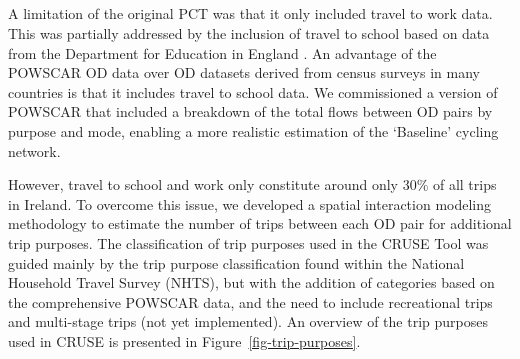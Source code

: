 \documentclass[
  super,
  preprint,
  3p]{elsarticle}
\providecommand{\DIFadd}[1]{{\protect\color{blue}\uwave{#1}}} %
\providecommand{\DIFaddbegin}{} %
\providecommand{\DIFaddend}{} %
\providecommand{\DIFdelbegin}{} %
\providecommand{\DIFdelend}{} %
\newcommand{\DIFscaledelfig}{0.5}
\newlength{\DIFdelgraphicswidth} %
\newlength{\DIFdelgraphicsheight} %
\newcommand{\DIFaddincludegraphics}[2][]{{\color{blue}\fbox{\DIFOincludegraphics[#1]{#2}}}} %
\newcommand{\DIFdelincludegraphics}[2][]{%
\sbox{\DIFdelgraphicsbox}{\DIFOincludegraphics[#1]{#2}}%
\settoboxwidth{\DIFdelgraphicswidth}{\DIFdelgraphicsbox} %
\settoboxtotalheight{\DIFdelgraphicsheight}{\DIFdelgraphicsbox} %
\scalebox{\DIFscaledelfig}{%
\parbox[b]{\DIFdelgraphicswidth}{\usebox{\DIFdelgraphicsbox}\\[-\baselineskip] \rule{\DIFdelgraphicswidth}{0em}}\llap{\resizebox{\DIFdelgraphicswidth}{\DIFdelgraphicsheight}{%
\setlength{\unitlength}{\DIFdelgraphicswidth}%
\begin{picture}(1,1)%
\thicklines\linethickness{2pt} %
{\color[rgb]{1,0,0}\put(0,0){\framebox(1,1){}}}%
{\color[rgb]{1,0,0}\put(0,0){\line( 1,1){1}}}%
{\color[rgb]{1,0,0}\put(0,1){\line(1,-1){1}}}%
\end{picture}%
}\hspace*{3pt}}} %
} %
\DeclareRobustCommand{\DIFaddbegin}{\DIFOaddbegin \let\includegraphics\DIFaddincludegraphics} %
\DeclareRobustCommand{\DIFaddend}{\DIFOaddend \let\includegraphics\DIFOincludegraphics} %
\DeclareRobustCommand{\DIFdelbegin}{\DIFOdelbegin \let\includegraphics\DIFdelincludegraphics} %
\DeclareRobustCommand{\DIFdelend}{\DIFOaddend \let\includegraphics\DIFOincludegraphics} %
\begin{document}
\DIFdelbegin %
\DIFdelend \DIFaddbegin \subsection{\DIFadd{Additional trip purposes}}\label{sec-trip-purposes}
\DIFaddend 

A limitation of the original PCT was that it only included travel to
work data. This was partially addressed by the inclusion of travel to
school based on data from the Department for Education in England
\citep{goodman2019}. An advantage of the POWSCAR OD data over OD
datasets derived from census surveys in many countries is that it
includes travel to school data. We commissioned a version of POWSCAR
that included a breakdown of the total flows between OD pairs by purpose
and mode, enabling a more realistic estimation of the `Baseline' cycling
network.

However, travel to school and work only constitute around only 30\% of
all trips in Ireland. To overcome this issue, we developed a spatial
interaction modeling methodology to estimate the number of trips between
each OD pair for additional trip purposes. The classification of trip
purposes used in the CRUSE Tool was guided mainly by the trip purpose
classification found within the National Household Travel Survey (NHTS),
but with the addition of categories based on the comprehensive POWSCAR
data, and the need to include recreational trips and multi-stage trips
(not yet implemented). An overview of the trip purposes used in CRUSE is
presented in Figure~\ref{fig-trip-purposes}.
\end{document}
